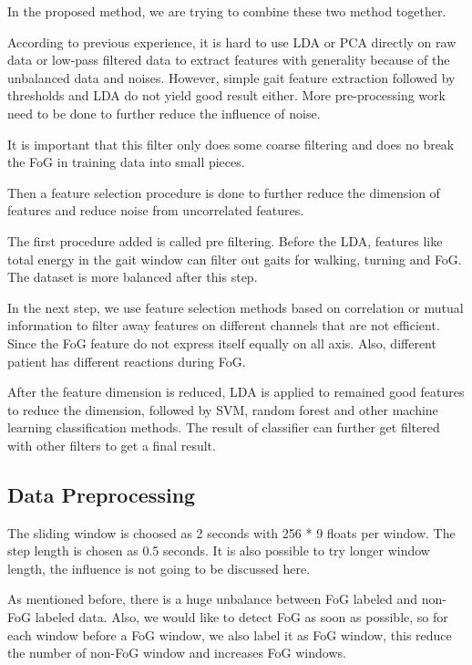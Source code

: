 \documentclass[article]{article}
\begin{document}
In the proposed method, we are trying to combine these two
method together.

According to previous experience, it is hard to use LDA or PCA directly on raw data or low-pass filtered data to extract features with generality because of the unbalanced data and noises.
However, simple gait feature extraction followed by thresholds and LDA do not yield good result either. More pre-processing work need to be done to further reduce the influence of noise. 

It is important that this filter only does some coarse filtering and does no break the FoG in training data into small pieces. 


Then a feature selection procedure is done to further reduce the dimension of features and reduce noise from uncorrelated features.

The first procedure added is called pre filtering. Before the LDA, features like total energy in the gait window can filter out gaits for walking, turning and FoG. The dataset is more balanced after this step.

In the next step,  we use feature selection methods based on correlation or mutual information to filter away features on different channels that are not efficient. Since the FoG feature do not express itself equally on all axis. Also, different patient has different reactions during FoG.  

After the feature dimension is reduced, LDA is applied to remained good features to reduce the dimension, followed by SVM, random forest and other machine learning classification methods. The result of classifier can further get filtered with other filters to get a final result.  

\subsection{Data Preprocessing}

	The sliding window is choosed as 2 seconds with 256 * 9 floats per window. The step length is chosen as 0.5 seconds. It is also possible to try longer window length, the influence is not going to be discussed here.
	
	As mentioned before, there is a huge unbalance between FoG labeled and non-FoG labeled data. Also, we would like to detect FoG as soon as possible, so for each window before a FoG window, we also label it as FoG window, this reduce the number of non-FoG window and increases FoG windows. 
	
\end{document}
